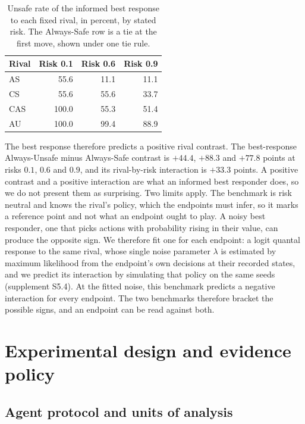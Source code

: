 \documentclass{article}
\begin{document}
\begin{table}[t]
\caption{Unsafe rate of the informed best response to each fixed rival, in percent,
by stated risk. The Always-Safe row is a tie at the first move, shown under one
tie rule.}
\label{tab:best-response}
\centering
\footnotesize
\setlength{\tabcolsep}{2pt}
\begin{tabular}{@{}lrrr@{}}
\toprule
Rival & Risk 0.1 & Risk 0.6 & Risk 0.9 \\
\midrule
AS  & 55.6 & 11.1 & 11.1 \\
CS & 55.6 & 55.6 & 33.7 \\
CAS & 100.0 & 55.3 & 51.4 \\
AU & 100.0 & 99.4 & 88.9 \\
\bottomrule
\end{tabular}
\end{table}

The best response therefore predicts a positive rival contrast. The best-response
Always-Unsafe minus Always-Safe contrast is $+44.4$, $+88.3$ and $+77.8$ points
at risks $0.1$, $0.6$ and $0.9$, and its rival-by-risk interaction is $+33.3$
points. A positive contrast and a positive interaction are what an informed best
responder does, so we do not present them as surprising. Two limits apply. The benchmark is
risk neutral and knows the rival's policy, which the endpoints must infer, so it marks a
reference point and not what an endpoint ought to play. A noisy best responder,
one that picks actions with probability rising in their value, can produce the
opposite sign. We therefore fit one for each endpoint: a logit quantal response
to the same rival, whose single noise parameter $\lambda$ is estimated by maximum
likelihood from the endpoint's own decisions at their recorded states, and we
predict its interaction by simulating that policy on the same seeds (supplement
S5.4). At the fitted noise, this benchmark predicts a negative interaction for
every endpoint. The two benchmarks therefore bracket the possible signs, and an
endpoint can be read against both.

\section{Experimental design and evidence policy}
\label{sec:design}
\subsection{Agent protocol and units of analysis}
\end{document}
